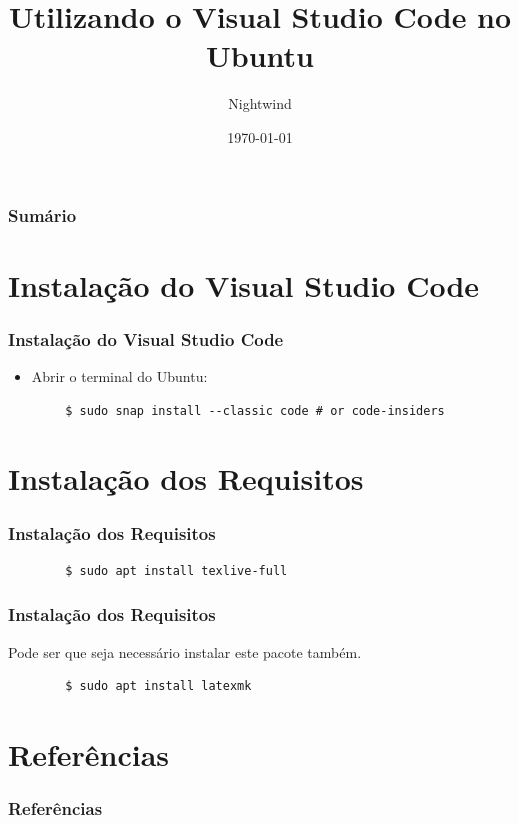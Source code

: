 \documentclass{beamer}
\title{Utilizando o Visual Studio Code no Ubuntu}
\author{Nightwind}
\institute[CTISM]{Colégio Técnico Industrial de Santa Maria}
\date{\today}
\begin{document}
\frame{\titlepage}

\begin{frame}
    \frametitle{Sumário}
    \tableofcontents
\end{frame}

\section{Instalação do Visual Studio Code}

\begin{frame}[fragile]
    \frametitle{Instalação do Visual Studio Code}
    \begin{itemize}
        \item Abrir o terminal do Ubuntu: 
    \end{itemize}
    \begin{lstlisting}
        $ sudo snap install --classic code # or code-insiders
    \end{lstlisting}
\end{frame}


\section{Instalação dos Requisitos}
\begin{frame}[fragile]
    \frametitle{Instalação dos Requisitos}
    \begin{lstlisting}
        $ sudo apt install texlive-full
    \end{lstlisting}
\end{frame}

\begin{frame}[fragile]
    \frametitle{Instalação dos Requisitos}
    Pode ser que seja necessário instalar este pacote também.
    \begin{lstlisting}
        $ sudo apt install latexmk
    \end{lstlisting}
\end{frame}

\section{Referências}

\begin{frame}[allowframebreaks]
    \frametitle{Referências}
    \nocite{TeXLiveUbuntu,VisualStudioCodeUbuntu}
    \printbibliography[]
\end{frame}
\end{document}
